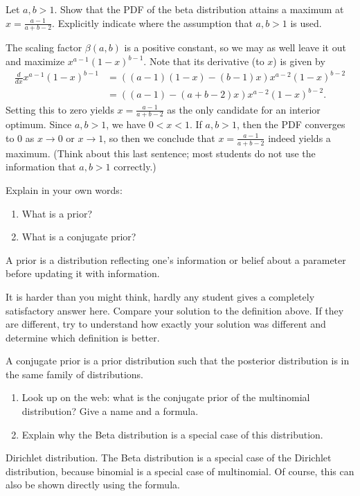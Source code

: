 \begin{exercise}
Let $a, b > 1$. Show that the PDF of the beta distribution attains a maximum at $x = \frac{a-1}{a+b-2}$. Explicitly indicate where the assumption that  $a, b > 1$ is used.
\begin{solution}
The scaling factor $\beta(a, b)$ is a positive constant, so we may as well leave it out and maximize $x^{a-1}(1-x)^{b-1}$. Note that its derivative (to $x$) is given by
\begin{align*}
\frac{d}{dx} x^{a-1}(1-x)^{b-1} &= ((a-1)(1-x) -(b-1)x)x^{a-2}(1-x)^{b-2} \\ &= ((a-1) - (a+b-2)x) x^{a-2}(1-x)^{b-2}.
\end{align*}
Setting this to zero yields $x = \frac{a-1}{a+b-2}$ as the only candidate for an interior optimum. Since $a, b > 1$, we have $0 < x < 1$. If  $a, b > 1$, then the PDF converges to 0 as $x \to 0$ or $x \to 1$, so then we conclude that $x = \frac{a-1}{a+b-2}$ indeed yields a maximum. (Think about this last sentence; most students do not use the information that $a,b>1$ correctly.)
\end{solution}
\end{exercise}


\begin{exercise}
Explain in your own words:
\begin{enumerate}
\item What is a prior?
\item What is a conjugate prior?
\end{enumerate}
\begin{solution}
A prior is a distribution reflecting one's information or belief about a parameter before updating it with information.

It is harder than you might think, hardly any student gives a completely satisfactory answer here. Compare your solution to the definition above. If they are different, try to understand how exactly your solution was different and determine which definition is better.

A conjugate prior is a prior distribution such that the posterior distribution is in the same family of distributions.
\end{solution}
\end{exercise}


\begin{exercise} \phantom{ }
\begin{enumerate}
\item Look up on the web: what is the conjugate prior of the multinomial distribution? Give a name and a formula.
\item Explain why the Beta distribution is a special case of this distribution.
\end{enumerate}
\begin{solution}
Dirichlet distribution. The Beta distribution is a special case of the Dirichlet distribution, because binomial is a special case of multinomial. Of course, this can also be shown directly using the formula.
\end{solution}
\end{exercise}



